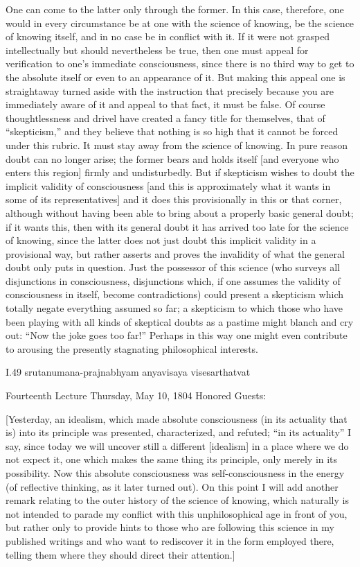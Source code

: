 One can come to the latter only through the former.
In this case, therefore, one would in every circumstance
be at one with the science of knowing,
be the science of knowing itself,
and in no case be in conflict with it.
If it were not grasped intellectually
but should nevertheless be true,
then one must appeal for verification
to one's immediate consciousness,
since there is no third way to get to the absolute itself
or even to an appearance of it.
But making this appeal one is straightaway turned aside
with the instruction that precisely because you are
immediately aware of it and appeal to that fact,
it must be false.
Of course thoughtlessness and drivel have
created a fancy title for themselves,
that of “skepticism,” and they believe that nothing is
so high that it cannot be forced under this rubric.
It must stay away from the science of knowing.
In pure reason doubt can no longer arise;
the former bears and holds itself
[and everyone who enters this region]
firmly and undisturbedly.
But if skepticism wishes to doubt
the implicit validity of consciousness
[and this is approximately what it
wants in some of its representatives]
and it does this provisionally in this or that corner,
although without having been able to bring about a properly basic
general doubt;
if it wants this, then with its general doubt
it has arrived too late for the science of knowing,
since the latter does not just doubt
this implicit validity in a provisional way,
but rather asserts and proves the invalidity of
what the general doubt only puts in question.
Just the possessor of this science
(who surveys all disjunctions in consciousness,
disjunctions which, if one assumes the validity
of consciousness in itself, become contradictions)
could present a skepticism which totally negate
everything assumed so far;
a skepticism to which those who have been playing
with all kinds of skeptical doubts as a pastime
might blanch and cry out: “Now the joke goes too far!”
Perhaps in this way one might even contribute
to arousing the presently stagnating philosophical interests.

I.49
srutanumana-prajnabhyam anyavisaya visesarthatvat

Fourteenth Lecture
Thursday, May 10, 1804
Honored Guests:

[Yesterday, an idealism, which made absolute consciousness
(in its actuality that is) into its principle was
presented, characterized, and refuted;
“in its actuality” I say,
since today we will uncover still
a different [idealism] in a place
where we do not expect it,
one which makes the same thing its principle,
only merely in its possibility.
Now this absolute consciousness was self-consciousness
in the energy (of reflective thinking, as it later turned out).
On this point I will add another remark
relating to the outer history of the science of knowing,
which naturally is not intended to parade my conflict
with this unphilosophical age in front of you,
but rather only to provide hints to those
who are following this science in my published writings
and who want to rediscover it in the form employed there,
telling them where they should direct their attention.]

